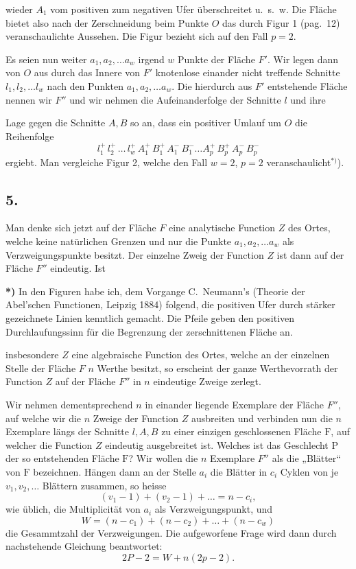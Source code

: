 \documentclass{article}
\begin{document}
wieder $A_1$ vom positiven zum negativen Ufer überschreitet u.~s.~w. Die Fläche bietet also nach der Zerschneidung beim Punkte $O$ das durch Figur 1 (pag.~12) veranschaulichte Aussehen. Die Figur bezieht sich auf den Fall $p = 2$.

Es seien nun weiter $a_1, a_2, \dots a_w$ irgend $w$ Punkte der Fläche $F'$. Wir legen dann von $O$ aus durch das Innere von $F'$ knotenlose einander nicht treffende Schnitte $l_1, l_2, \dots l_w$ nach den Punkten $a_1, a_2, \dots a_w$. Die hierdurch aus $F'$ entstehende Fläche nennen wir $F''$ und wir nehmen die Aufeinanderfolge der Schnitte $l$ und ihre


Lage gegen die Schnitte $A, B$ so an, dass ein positiver Umlauf um $O$ die Reihenfolge
\[
l_1^+ \, l_2^+ \, \dots \, l_w^+ \, A_1^+ \, B_1^+ \, A_1^- \, B_1^- \dots A_p^+ \, B_p^+ \, A_p^- \, B_p^-
\]
ergiebt. Man vergleiche Figur 2, welche den Fall $w = 2$, $p = 2$ veranschaulicht${}^{*)}$).

\subsection*{5.}

Man denke sich jetzt auf der Fläche $F$ eine analytische Function $Z$ des Ortes, welche keine natürlichen Grenzen und nur die Punkte $a_1, a_2, \dots a_w$ als Verzweigungspunkte besitzt. Der einzelne Zweig der Function $Z$ ist dann auf der Fläche $F''$ eindeutig. Ist

\textbf{*)} In den Figuren habe ich, dem Vorgange C.~Neumann's (Theorie der Abel'schen Functionen, Leipzig 1884) folgend, die positiven Ufer durch stärker gezeichnete Linien kenntlich gemacht. Die Pfeile geben den positiven Durchlaufungssinn für die Begrenzung der zerschnittenen Fläche an.

insbesondere $Z$ eine algebraische Function des Ortes, welche an der einzelnen Stelle der Fläche $F$ $n$ Werthe besitzt, so erscheint der ganze Werthevorrath der Function $Z$ auf der Fläche $F''$ in $n$ eindeutige Zweige zerlegt.

Wir nehmen dementsprechend $n$ in einander liegende Exemplare der Fläche $F''$, auf welche wir die $n$ Zweige der Function $Z$ ausbreiten und verbinden nun die $n$ Exemplare längs der Schnitte $l, A, B$ zu einer einzigen geschlossenen Fläche $\mathrm{F}$, auf welcher die Function $Z$ eindeutig ausgebreitet ist. Welches ist das Geschlecht $\mathrm{P}$ der so entstehenden Fläche $\mathrm{F}$? Wir wollen die $n$ Exemplare $F''$ als die „Blätter“ von $\mathrm{F}$ bezeichnen. Hängen dann an der Stelle $a_i$ die Blätter in $c_i$ Cyklen von je $v_1, v_2, \dots$ Blättern zusammen, so heisse
\[
(v_1 - 1) + (v_2 - 1) + \dots = n - c_i,
\]
wie üblich, die Multiplicität von $a_i$ als Verzweigungspunkt, und
\[
W = (n - c_1) + (n - c_2) + \dots + (n - c_w)
\]
die Gesammtzahl der Verzweigungen. Die aufgeworfene Frage wird dann durch nachstehende Gleichung beantwortet:
\[
2P - 2 = W + n(2p - 2).
\tag{1}
\]
\end{document}
